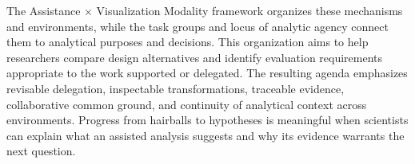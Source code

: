 The Assistance $\times$ Visualization Modality framework organizes these mechanisms and environments, while the task groups and locus of analytic agency connect them to analytical purposes and decisions. This organization aims to help researchers compare design alternatives and identify evaluation requirements appropriate to the work supported or delegated. The resulting agenda emphasizes revisable delegation, inspectable transformations, traceable evidence, collaborative common ground, and continuity of analytical context across environments. Progress from hairballs to hypotheses is meaningful when scientists can explain what an assisted analysis suggests and why its evidence warrants the next question.
